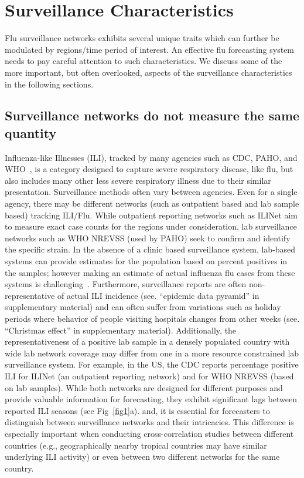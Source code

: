 \documentclass[10pt,letterpaper]{article}
\begin{document}
\section*{Surveillance Characteristics}
Flu surveillance networks exhibits several unique traits which can further be
modulated by regions/time period of interest. An effective flu forecasting 
system needs to pay careful attention to such characteristics. We discuss some
of the more important, but often overlooked, aspects of the surveillance
characteristics in the following sections.

\subsection*{Surveillance networks do not measure the same quantity}
Influenza-like Illnesses (ILI), tracked by many agencies such as CDC, PAHO, and
WHO~\cite{cdc,paho,who}, is a category designed to capture severe respiratory
disease, like flu, but also includes many other less severe
respiratory illness due to their similar presentation. Surveillance methods
often vary between agencies. Even for a single agency, there may be different
networks (such as outpatient based and lab sample based) tracking ILI/Flu.
While outpatient reporting networks such as ILINet aim to measure exact case
counts for the regions under consideration, lab surveillance networks such as
WHO NREVSS (used by PAHO) seek to confirm and identify the specific strain.  In
the absence of a clinic based surveillance system, lab-based systems can
provide estimates for the population based on percent positives in the samples;
however making an estimate of actual influenza flu cases from these systems is challenging~\cite{cdc}.
Furthermore, surveillance reports are often non-representative of actual ILI
incidence (see. ``epidemic data pyramid'' in supplementary material)
and can often suffer from variations such as holiday periods where behavior of
people visiting hospitals changes from other weeks (see.  ``Christmas effect''
in supplementary material).
Additionally, the representativeness of a positive lab sample
in a densely populated country with wide lab network coverage may
differ from one in a more resource constrained lab surveillance system. For
example, in the US, the CDC reports percentage positive ILI for ILINet (an
outpatient reporting network) and for WHO NREVSS (based on lab samples). While
both networks are designed for different purposes and provide valuable
information for forecasting, they exhibit significant lags between reported ILI seasons (see
Fig~\ref{fig1}a).  and, it is essential for forecasters to distinguish between
surveillance networks and their intricacies.  This difference is especially
important when conducting cross-correlation studies between different countries
(e.g., geographically nearby tropical countries may have similar underlying ILI
activity) or even between two different networks for the same country.
\end{document}

